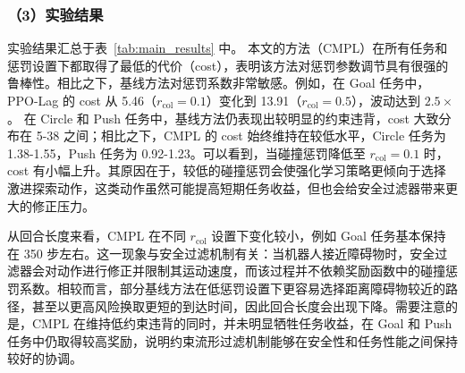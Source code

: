 

\subsubsection{（3）实验结果}
实验结果汇总于表~\ref{tab:main_results} 中。
本文的方法（CMPL）在所有任务和惩罚设置下都取得了最低的代价（cost），表明该方法对惩罚参数调节具有很强的鲁棒性。相比之下，基线方法对惩罚系数非常敏感。例如，在 Goal 任务中，PPO-Lag 的 cost 从 5.46（$r_{\text{col}}=0.1$）变化到 13.91（$r_{\text{col}}=0.5$），波动达到 $2.5\times$。
在 Circle 和 Push 任务中，基线方法仍表现出较明显的约束违背，cost 大致分布在 5-38 之间；相比之下，CMPL 的 cost 始终维持在较低水平，Circle 任务为 1.38-1.55，Push 任务为 0.92-1.23。可以看到，当碰撞惩罚降低至 $r_{\text{col}}=0.1$ 时，cost 有小幅上升。其原因在于，较低的碰撞惩罚会使强化学习策略更倾向于选择激进探索动作，这类动作虽然可能提高短期任务收益，但也会给安全过滤器带来更大的修正压力。

从回合长度来看，CMPL 在不同 $r_{\text{col}}$ 设置下变化较小，例如 Goal 任务基本保持在 350 步左右。这一现象与安全过滤机制有关：当机器人接近障碍物时，安全过滤器会对动作进行修正并限制其运动速度，而该过程并不依赖奖励函数中的碰撞惩罚系数。相较而言，部分基线方法在低惩罚设置下更容易选择距离障碍物较近的路径，甚至以更高风险换取更短的到达时间，因此回合长度会出现下降。需要注意的是，CMPL 在维持低约束违背的同时，并未明显牺牲任务收益，在 Goal 和 Push 任务中仍取得较高奖励，说明约束流形过滤机制能够在安全性和任务性能之间保持较好的协调。

